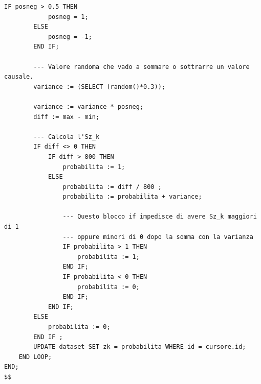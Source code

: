 \begin{lstlisting}[style = mystyle]
		IF posneg > 0.5 THEN
			posneg = 1;
		ELSE
			posneg = -1;
		END IF;

		--- Valore randoma che vado a sommare o sottrarre un valore causale.
		variance := (SELECT (random()*0.3));
		
		variance := variance * posneg;
		diff := max - min;
		
		--- Calcola l'Sz_k
		IF diff <> 0 THEN
			IF diff > 800 THEN
				probabilita := 1;
			ELSE
				probabilita := diff / 800 ;
				probabilita := probabilita + variance;
				
				--- Questo blocco if impedisce di avere Sz_k maggiori di 1
				--- oppure minori di 0 dopo la somma con la varianza
				IF probabilita > 1 THEN
					probabilita := 1;
				END IF;
				IF probabilita < 0 THEN
					probabilita := 0;
				END IF;
			END IF;
		ELSE
			probabilita := 0;
		END IF ;
		UPDATE dataset SET zk = probabilita WHERE id = cursore.id;
	END LOOP;
END;
$$
\end{lstlisting}
